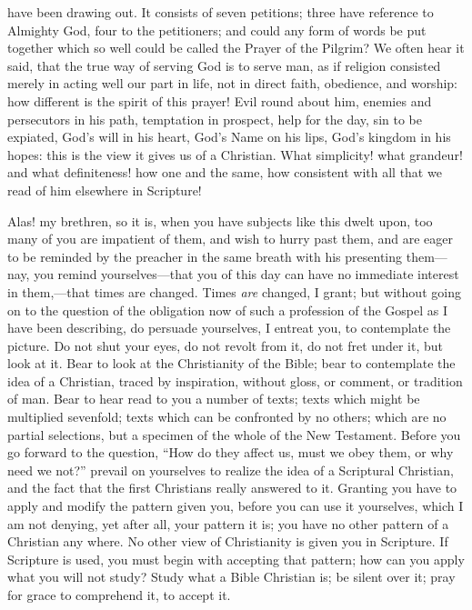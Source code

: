have been drawing out. It consists of seven petitions; three have
reference to Almighty God, four to the petitioners; and could any form
of words be put together which so well could be called the Prayer of
the Pilgrim? We often hear it said, that the true way of serving God
is to serve man, as if religion consisted merely in acting well our
part in life, not in direct faith, obedience, and worship: how
different is the spirit of this prayer! Evil round about him, enemies
and persecutors in his path, temptation in prospect, help for the day,
sin to be expiated, God's will in his heart, God's Name on his lips,
God's kingdom in his hopes: this is the view it gives us of a
Christian. What simplicity! what grandeur! and what definiteness! how
one and the same, how consistent with all that we read of him
elsewhere in Scripture!

Alas! my brethren, so it is, when you have subjects like this dwelt
upon, too many of you are impatient of them, and wish to hurry past
them, and are eager to be reminded by the preacher in the same breath
with his presenting them—nay, you remind yourselves—that you of
this day can have no immediate interest in them,—that times are
changed. Times \emph{are} changed, I grant; but without going on to
the question of the obligation now of such a profession of the Gospel
as I have been describing, do persuade yourselves, I entreat you, to
contemplate the picture. Do not shut your eyes, do not revolt from it,
do not fret under it, but look at it. Bear to look at the Christianity
of the Bible; bear to contemplate the idea of a Christian, traced by
inspiration, without gloss, or comment, or tradition of man. Bear
to
hear read to you a number of texts; texts which might be multiplied
sevenfold; texts which can be confronted by no others; which are no
partial selections, but a specimen of the whole of the New Testament.
Before you go forward to the question, ``How do they affect us,
must we obey them, or why need we not?'' prevail on yourselves to
realize the idea of a Scriptural Christian, and the fact that the
first Christians really answered to it. Granting you have to apply and
modify the pattern given you, before you can use it yourselves, which
I am not denying, yet after all, your pattern it is; you have no other
pattern of a Christian any where. No other view of Christianity is
given you in Scripture. If Scripture is used, you must begin with
accepting that pattern; how can you apply what you will not study?
Study what a Bible Christian is; be silent over it; pray for grace to
comprehend it, to accept it.

